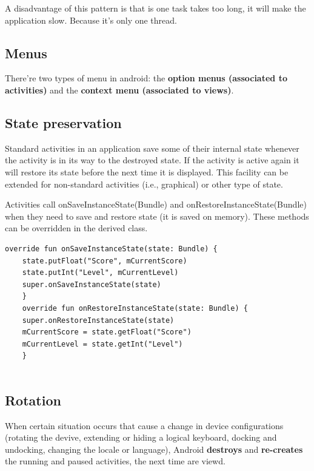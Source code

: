 \begin{tcolorbox}[colback=red!5,colframe=red!75!black, title=Disadvantages on IoC]
    A disadvantage of this pattern is that is one task takes too long, it will make the application slow.
    Because it's only one thread.
\end{tcolorbox}

\subsection{Menus}
There're two types of menu in android: the \textbf{option menus (associated to activities)} and the \textbf{context menu 
(associated to views)}. 



\subsection{State preservation}

Standard activities in an application save some of their internal state whenever the activity is in
its way to the destroyed state. If the activity is active again it will restore its state before the
next time it is displayed.
This facility can be extended for non-standard activities (i.e., graphical) or other type of state.

Activities call onSaveInstanceState(Bundle) and onRestoreInstanceState(Bundle) when they need to
save and restore state (it is saved on memory).
These methods can be overridden in the derived class.

\begin{lstlisting}
override fun onSaveInstanceState(state: Bundle) {
    state.putFloat("Score", mCurrentScore)
    state.putInt("Level", mCurrentLevel)
    super.onSaveInstanceState(state)
    }
    override fun onRestoreInstanceState(state: Bundle) {
    super.onRestoreInstanceState(state)
    mCurrentScore = state.getFloat("Score")
    mCurrentLevel = state.getInt("Level")
    }
    
\end{lstlisting}

\subsection{Rotation}
When certain situation occurs that cause a change in device configurations
(rotating the devive, extending or hiding a logical keyboard, docking and undocking,
changing the locale or language), Android \textbf{destroys} and \textbf{re-creates} 
the running and paused activities, the next time are viewd. 

